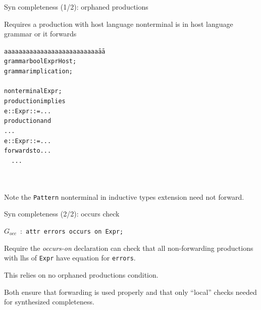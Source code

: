 \documentclass[notes,11pt,aspectratio=169]{beamer}
\begin{document}
\begin{frame}{Syn completeness (1/2): orphaned productions}

Requires a production with host language nonterminal is 
\bi
 \x in host language grammar
 \x or it forwards
\ei

\begin{alltt}
\begin{tabbing}
aaaaaaaaaaaaaaaaaaaaaaaaaa\=aa\=\kill
grammar boolExprHost;
\>grammar implication; \\

\\

nonterminal Expr;
\>production implies \\

\>e::Expr ::= ... \\

production and  
\>\ttlbrace\>... \\

e::Expr ::= ... 
\>\>forwards to ... \ttrbrace \\

\ttlbrace\ \ ... \ttrbrace \\


\> \\
\> \\
\>
\end{tabbing}
\end{alltt}


\bigskip
Note the \texttt{Pattern} nonterminal in inductive types extension need
not forward.
\end{frame}


\begin{frame}[t]{Syn completeness (2/2): occurs check}
\begin{tabbing}
$G_{occ}$\ :\  \texttt{attr errors occurs on Expr;}
\end{tabbing}

\bigskip
Require the \emph{occurs-on} declaration can check that all non-forwarding
productions with lhs of \texttt{Expr} have equation for
\texttt{errors}. 

\bigskip
This relies on no orphaned productions condition.

\bigskip
Both ensure that forwarding is used properly and that only ``local''
checks needed for synthesized completeness.
\end{frame}
\end{document}
